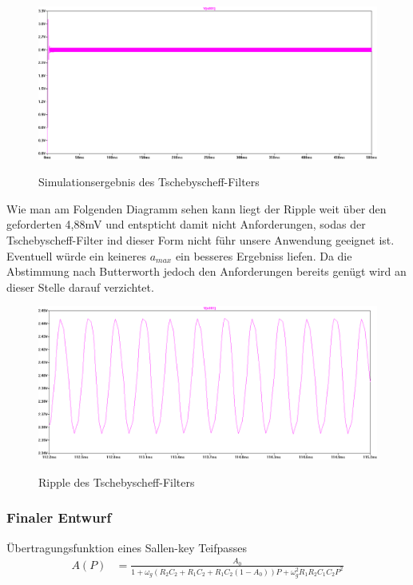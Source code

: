 \documentclass[11pt,twoside,openright]{mpreport}
\begin{document}
\begin{figure}[H]
\centering
\includegraphics[width=.96\textwidth]{plott_ts.png}\\
\caption{Simulationsergebnis des Tschebyscheff-Filters}%
\label{fig:tp-plott-ts}
\end{figure}

Wie man am Folgenden Diagramm sehen kann liegt der Ripple weit über den geforderten 4,88mV  und entspticht damit nicht Anforderungen, sodas
der Tschebyscheff-Filter ind dieser Form nicht führ unsere Anwendung geeignet ist. Eventuell würde ein keineres $a_{max}$ ein besseres Ergebniss
liefen. Da die Abstimmung nach Butterworth jedoch den Anforderungen bereits genügt wird an dieser Stelle darauf verzichtet.

\begin{figure}[H]
\centering
\includegraphics[width=.96\textwidth]{ripple_ts.png}\\
\caption{Ripple des Tschebyscheff-Filters}%
\label{fig:plott_ripple-ts}
\end{figure}


\subsubsection{Finaler Entwurf}
Übertragungsfunktion eines Sallen-key Teifpasses
\begin{align*}
A(P)&=\frac{A_0}{1+\omega_g (R_2 C_2 + R_1 C_2 + R_1 C_2(1-A_0))P + \omega_g^2R_1 R_2 C_1C_2P^2}
\end{align*}
\end{document}
